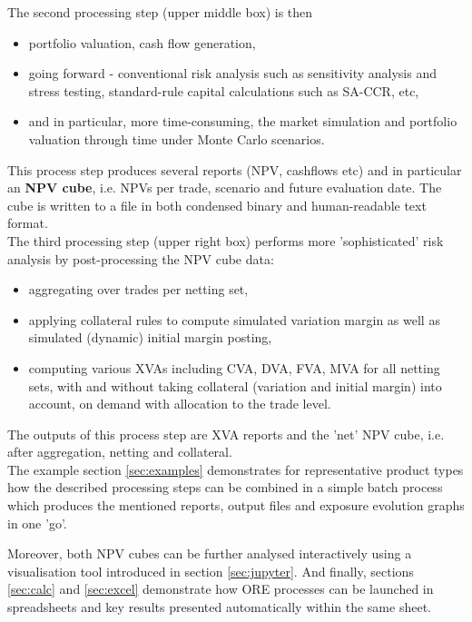 \documentclass[12pt, a4paper]{article}
\begin{document}
The second processing step (upper middle box) is then 
\begin{itemize}
\item portfolio valuation, cash flow generation,
\item going forward - conventional risk analysis such as sensitivity analysis and stress testing, standard-rule capital
  calculations such as SA-CCR, etc,
\item and in particular, more time-consuming, the market simulation and portfolio valuation through time under Monte
  Carlo scenarios.
\end{itemize}
This process step produces several reports (NPV, cashflows etc) and in particular an {\bf NPV cube}, i.e. NPVs per
trade, scenario and future evaluation date. The cube is written to a file in both condensed binary and human-readable
text format.  \\

The third processing step (upper right box) performs more 'sophisticated' risk ana\-ly\-sis by post-processing the NPV
cube data:
\begin{itemize}
\item aggregating over trades per netting set, 
\item applying collateral rules to compute simulated variation margin as well as simulated (dynamic) initial margin
  posting,
\item computing various XVAs including CVA, DVA, FVA, MVA for all netting sets, with and without taking collateral
  (variation and initial margin) into account, on demand with allocation to the trade level.
\end{itemize}
The outputs of this process step are XVA reports and the 'net' NPV cube, i.e. after aggregation, netting and collateral. \\

The example section \ref{sec:examples} demonstrates for representative product types how the described processing steps
can be combined in a simple batch process which produces the mentioned reports, output files and exposure evolution
graphs in one 'go'.

Moreover, both NPV cubes can be further analysed interactively using a visualisation tool introduced in section
\ref{sec:jupyter}. And finally, sections \ref{sec:calc} and \ref{sec:excel} demonstrate how ORE processes can be
launched in spreadsheets and key results presented automatically within the same sheet.

\end{document}
